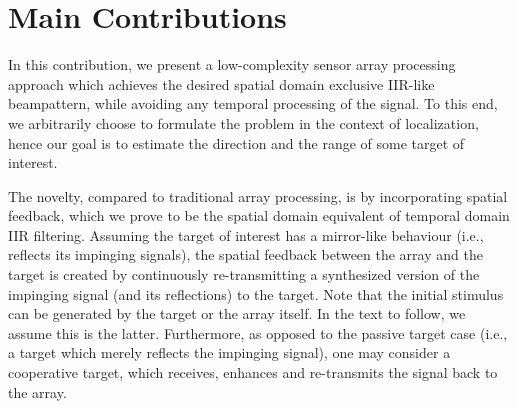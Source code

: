 \section{Main Contributions}
\par In this contribution, we present a low-complexity sensor array processing approach which achieves the desired spatial domain exclusive IIR-like beampattern, while avoiding any temporal processing of the signal.
To this end, we arbitrarily choose to formulate the problem in the context of localization, hence our goal is to estimate the direction and the range of some target of interest. 
\par The novelty, compared to traditional array processing, is by incorporating spatial feedback, which we prove to be the spatial domain equivalent of temporal domain IIR filtering.
Assuming the target of interest has a mirror-like behaviour (i.e., reflects its impinging signals), the spatial feedback between the array and the target is created by continuously re-transmitting a synthesized version of the impinging signal (and its reflections) to the target.
Note that the initial stimulus can be generated by the target or the array itself. In the text to follow, we assume this is the latter. 
Furthermore, as opposed to the passive target case (i.e., a target which merely reflects the impinging signal), one may consider a cooperative target, which receives, enhances and re-transmits the signal back to the array.
